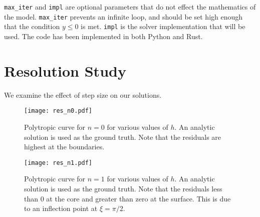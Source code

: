 \documentclass[twocolumn]{aastex631}
\begin{document}
\texttt{max_iter} and \texttt{impl} are optional parameters that do not
effect the mathematics of the model. \texttt{max_iter} prevents
an infinite loop, and should be set high enough that the
condition $y\le 0$ is met. \texttt{impl} is the solver
implementation that will be used. The code has been implemented
in both Python and Rust.


\section{Resolution Study}
\label{sec:res}

We examine the effect of step size on our solutions.

\begin{figure}
    \begin{centering}
        \texttt{[image: res\_n0.pdf]}
        \caption{Polytropic curve for $n=0$ for various
        values of $h$. An analytic solution is used as
        the ground truth. Note that the residuals are highest
        at the boundaries.}
    \end{centering}
\end{figure}

\begin{figure}
    \begin{centering}
        \texttt{[image: res\_n1.pdf]}
        \caption{Polytropic curve for $n=1$ for various
        values of $h$. An analytic solution is used as
        the ground truth. Note that the residuals less than 0
        at the core and greater than zero at the surface. This
        is due to an inflection point at $\xi=\pi/2$.}
    \end{centering}
\end{figure}






\end{document}
